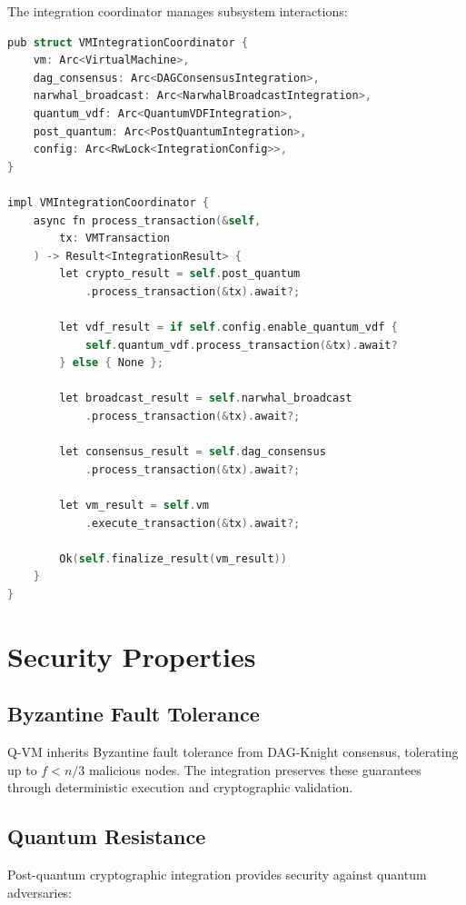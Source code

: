 \documentclass[11pt]{article}
\begin{document}
The integration coordinator manages subsystem interactions:

\begin{lstlisting}[language=C, caption=Q-VM Integration Coordinator]
pub struct VMIntegrationCoordinator {
    vm: Arc<VirtualMachine>,
    dag_consensus: Arc<DAGConsensusIntegration>,
    narwhal_broadcast: Arc<NarwhalBroadcastIntegration>,
    quantum_vdf: Arc<QuantumVDFIntegration>,
    post_quantum: Arc<PostQuantumIntegration>,
    config: Arc<RwLock<IntegrationConfig>>,
}

impl VMIntegrationCoordinator {
    async fn process_transaction(&self, 
        tx: VMTransaction
    ) -> Result<IntegrationResult> {
        let crypto_result = self.post_quantum
            .process_transaction(&tx).await?;
        
        let vdf_result = if self.config.enable_quantum_vdf {
            self.quantum_vdf.process_transaction(&tx).await?
        } else { None };
        
        let broadcast_result = self.narwhal_broadcast
            .process_transaction(&tx).await?;
        
        let consensus_result = self.dag_consensus
            .process_transaction(&tx).await?;
        
        let vm_result = self.vm
            .execute_transaction(&tx).await?;
        
        Ok(self.finalize_result(vm_result))
    }
}
\end{lstlisting}

\section{Security Properties}

\subsection{Byzantine Fault Tolerance}

Q-VM inherits Byzantine fault tolerance from DAG-Knight consensus, tolerating up to $f < n/3$ malicious nodes. The integration preserves these guarantees through deterministic execution and cryptographic validation.

\subsection{Quantum Resistance}

Post-quantum cryptographic integration provides security against quantum adversaries:
\end{document}
